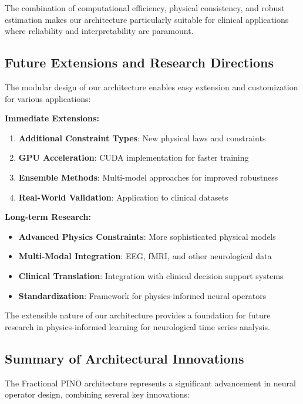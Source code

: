 The combination of computational efficiency, physical consistency, and robust estimation makes our architecture particularly suitable for clinical applications where reliability and interpretability are paramount.

\subsection{Future Extensions and Research Directions}

The modular design of our architecture enables easy extension and customization for various applications:

\textbf{Immediate Extensions:}
\begin{enumerate}
    \item \textbf{Additional Constraint Types}: New physical laws and constraints
    \item \textbf{GPU Acceleration}: CUDA implementation for faster training
    \item \textbf{Ensemble Methods}: Multi-model approaches for improved robustness
    \item \textbf{Real-World Validation}: Application to clinical datasets
\end{enumerate}

\textbf{Long-term Research:}
\begin{itemize}
    \item \textbf{Advanced Physics Constraints}: More sophisticated physical models
    \item \textbf{Multi-Modal Integration}: EEG, fMRI, and other neurological data
    \item \textbf{Clinical Translation}: Integration with clinical decision support systems
    \item \textbf{Standardization}: Framework for physics-informed neural operators
\end{itemize}

The extensible nature of our architecture provides a foundation for future research in physics-informed learning for neurological time series analysis.

\subsection{Summary of Architectural Innovations}

The Fractional PINO architecture represents a significant advancement in neural operator design, combining several key innovations:

